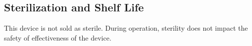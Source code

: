 \newpage
\subsection{Sterilization and Shelf Life}

This device is not sold as sterile. During operation, sterility
does not impact the safety of effectiveness of the device.
